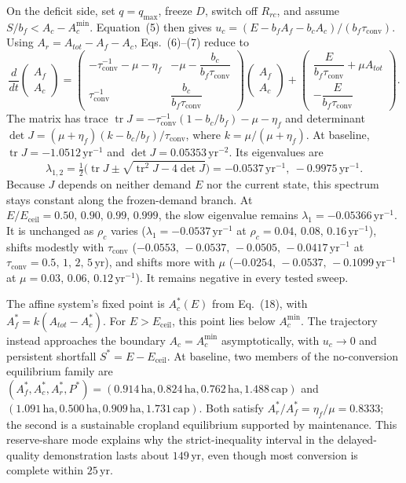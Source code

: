 \documentclass[11pt,a4paper]{article}
\newcommand{\Eceil}{E_{\mathrm{ceil}}}
\newcommand{\Acmin}{A_c^{\min}}
\newcommand{\tconv}{\tau_{\mathrm{conv}}}
\begin{document}
On the deficit side, set $q=q_{\max}$, freeze $D$, switch off $R_{rc}$, and assume $S/b_f<A_c-\Acmin$. Equation~(5) then gives $u_c=(E-b_fA_f-b_cA_c)/(b_f\tconv)$. Using $A_r=A_{tot}-A_f-A_c$, Eqs.~(6)--(7) reduce to
\begin{equation}
\frac{d}{dt}\begin{pmatrix}A_f\\A_c\end{pmatrix}=
\begin{pmatrix}-\tconv^{-1}-\mu-\eta_f & -\mu-\dfrac{b_c}{b_f\tconv}\\[8pt]\tconv^{-1} & \dfrac{b_c}{b_f\tconv}\end{pmatrix}
\begin{pmatrix}A_f\\A_c\end{pmatrix}+
\begin{pmatrix}\dfrac{E}{b_f\tconv}+\mu A_{tot}\\[8pt]-\dfrac{E}{b_f\tconv}\end{pmatrix}.
\end{equation}
The matrix has trace $\operatorname{tr}J=-\tconv^{-1}(1-b_c/b_f)-\mu-\eta_f$ and determinant $\det J=(\mu+\eta_f)(k-b_c/b_f)/\tconv$, where $k=\mu/(\mu+\eta_f)$. At baseline, $\operatorname{tr}J=-1.0512\,\mathrm{yr}^{-1}$ and $\det J=0.05353\,\mathrm{yr}^{-2}$. Its eigenvalues are
\begin{equation}
\lambda_{1,2}=\tfrac12\Big(\operatorname{tr}J\pm\sqrt{\operatorname{tr}^2J-4\det J}\Big)=-0.0537\,\mathrm{yr}^{-1},\ -0.9975\,\mathrm{yr}^{-1}.
\end{equation}
Because $J$ depends on neither demand $E$ nor the current state, this spectrum stays constant along the frozen-demand branch. At $E/\Eceil=0.50,\,0.90,\,0.99,\,0.999$, the slow eigenvalue remains $\lambda_1=-0.05366\,\mathrm{yr}^{-1}$. It is unchanged as $\rho_c$ varies ($\lambda_1=-0.0537\,\mathrm{yr}^{-1}$ at $\rho_c=0.04,\,0.08,\,0.16\,\mathrm{yr}^{-1}$), shifts modestly with $\tconv$ ($-0.0553,\,-0.0537,\,-0.0505,\,-0.0417\,\mathrm{yr}^{-1}$ at $\tconv=0.5,\,1,\,2,\,5\,\mathrm{yr}$), and shifts more with $\mu$ ($-0.0254,\,-0.0537,\,-0.1099\,\mathrm{yr}^{-1}$ at $\mu=0.03,\,0.06,\,0.12\,\mathrm{yr}^{-1}$). It remains negative in every tested sweep.

The affine system's fixed point is $A_c^*(E)$ from Eq.~(18), with $A_f^*=k(A_{tot}-A_c^*)$. For $E>\Eceil$, this point lies below $\Acmin$. The trajectory instead approaches the boundary $A_c=\Acmin$ asymptotically, with $u_c\to0$ and persistent shortfall $S^*=E-\Eceil$. At baseline, two members of the no-conversion equilibrium family are $(A_f^*,A_c^*,A_r^*,P^*)=(0.914\,\mathrm{ha},0.824\,\mathrm{ha},0.762\,\mathrm{ha},1.488\,\mathrm{cap})$ and $(1.091\,\mathrm{ha},0.500\,\mathrm{ha},0.909\,\mathrm{ha},1.731\,\mathrm{cap})$. Both satisfy $A_r^*/A_f^*=\eta_f/\mu=0.8333$; the second is a sustainable cropland equilibrium supported by maintenance. This reserve-share mode explains why the strict-inequality interval in the delayed-quality demonstration lasts about $149$\,yr, even though most conversion is complete within $25$\,yr.
\end{document}
